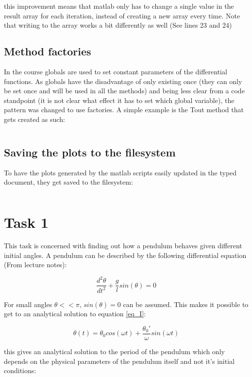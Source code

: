 \documentclass[14pt]{article}
\begin{document}
this improvement means that matlab only has to change a single value in the result array for each iteration, instead of creating a new array every time.
Note that writing to the array works a bit differently as well (See lines 23 and 24)

\subsection{Method factories}
In the course globals are used to set constant parameters of the differential functions. 
As globals have the disadvantage of only existing once (they can only be set once and will be used in all the methods) and being less clear from a code standpoint
(it is not clear what effect it has to set which global variable), the pattern was changed to use factories. A simple example is the Tout method that gets created as such:
\inputminted[linenos, firstline=1, lastline=16]{octave}{./matlab/make_Tout.m}

\subsection{Saving the plots to the filesystem}
To have the plots generated by the matlab scripts easily updated in the typed document, they get saved to the filesystem:
\inputminted[linenos, firstline=51, lastline=51]{octave}{./matlab/assignment_2.m}

\section{Task 1}
This task is concerned with finding out how a pendulum behaves given different initial angles. A pendulum can be described by the following
differential equation (From lecture notes):

\begin{equation}\label{eq_I}
  \frac{d^2 \theta}{d t^2} + \frac{g}{l}sin(\theta) = 0
\end{equation}

For small angles $\theta << \pi$, $sin(\theta) = 0$ can be assumed. This makes it possible to get to an
analytical solution to equation \ref{eq_I}:

$$
\theta(t) = \theta_0 cos(\omega t) + \frac{\theta_0'}{\omega} sin(\omega t) 
$$

this gives an analytical solution to the period of the pendulum which only depends on the physical parameters of the pendulum
itself and not it's initial conditions:
\end{document}
